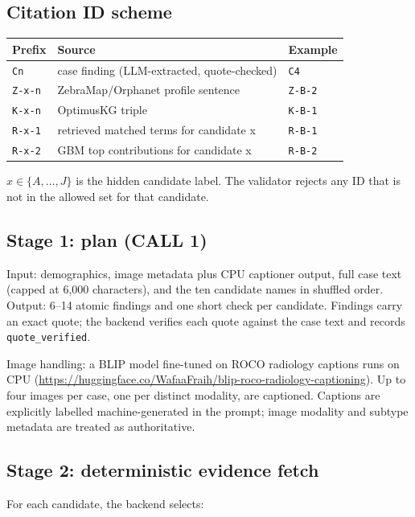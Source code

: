 \documentclass[11pt,a4paper]{article}
\newcommand{\code}[1]{\texttt{\small #1}}
\begin{document}
\subsection{Citation ID scheme}

\begin{center}
\begin{tabular}{lll}
\toprule
Prefix & Source & Example\\
\midrule
\code{Cn} & case finding (LLM-extracted, quote-checked) & \code{C4}\\
\code{Z-x-n} & ZebraMap/Orphanet profile sentence & \code{Z-B-2}\\
\code{K-x-n} & OptimusKG triple & \code{K-B-1}\\
\code{R-x-1} & retrieved matched terms for candidate x & \code{R-B-1}\\
\code{R-x-2} & GBM top contributions for candidate x & \code{R-B-2}\\
\bottomrule
\end{tabular}
\end{center}
$x\in\{A,\dots,J\}$ is the hidden candidate label. The validator rejects any ID
that is not in the allowed set for that candidate.

\subsection{Stage 1: plan (CALL 1)}

Input: demographics, image metadata plus CPU captioner output, full case text
(capped at 6,000 characters), and the ten candidate names in shuffled order.
Output: 6--14 atomic findings and one short check per candidate. Findings carry an
exact quote; the backend verifies each quote against the case text and records
\code{quote\_verified}.

Image handling: a BLIP model fine-tuned on ROCO radiology captions runs on CPU
(\url{https://huggingface.co/WafaaFraih/blip-roco-radiology-captioning}). Up to four
images per case,
one per distinct modality, are captioned. Captions are explicitly labelled
machine-generated in the prompt; image modality and subtype metadata are treated as
authoritative.

\subsection{Stage 2: deterministic evidence fetch}

For each candidate, the backend selects:
\end{document}
